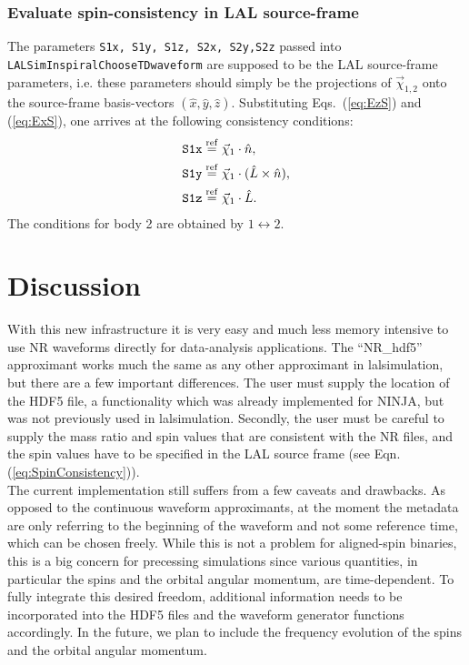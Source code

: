 \documentclass[aps,prd,amssymb,amsmath,amsfonts,superscriptaddress,
floatfix ,preprintnumbers,altaffilletter]{revtex4}
\newcommand{\nNR}{\hat{n}}
\newcommand{\lNR}{\hat L}
\newcommand{\ExS}{{{\hat x}}}
\newcommand{\EyS}{{{\hat y}}}
\newcommand{\EzS}{{{\hat z}}}
\newcommand{\equalref}{\overset{\rm ref}{=}}
\begin{document}
\subsubsection{Evaluate spin-consistency in LAL source-frame}

The parameters {\tt S1x, S1y, S1z, S2x, S2y,S2z} passed into {\tt
  LALSimInspiralChooseTDwaveform} are supposed to be the LAL
source-frame parameters, i.e. these parameters should simply be the
projections of $\vec\chi_{1,2}$ onto the source-frame basis-vectors
$(\ExS,\EyS,\EzS)$.  Substituting Eqs.~(\ref{eq:EzS}) and (\ref{eq:ExS}),
one arrives at the following consistency conditions:
\begin{subequations}
\label{eq:SpinConsistency}
  \begin{align}
    \mbox{\tt S1x} &  \equalref \vec\chi_1 \cdot \nNR,\\
    \mbox{\tt S1y} &  \equalref \vec\chi_1\cdot (\lNR\times\nNR),\\
    \mbox{\tt S1z} &  \equalref \vec\chi_1 \cdot \lNR.
  \end{align}
\end{subequations}
The conditions for body 2 are obtained by $1\leftrightarrow 2$.\\


\section{Discussion}
\label{sec:discussion}

With this new infrastructure it is very easy and much less memory intensive to use NR waveforms
directly for data-analysis applications. The ``NR\_hdf5'' approximant works much the same as any other approximant
in lalsimulation, but there are a few important differences.
The user must supply the location of the HDF5 file, a functionality which was already implemented for NINJA, but was not
previously used in lalsimulation. Secondly, the user must be careful to supply the mass ratio and spin values that
are consistent with the NR files, and the spin values have to be specified in the LAL source frame (see Eqn. (\ref{eq:SpinConsistency})). \\

The current implementation still suffers from a few caveats and drawbacks. As opposed to the continuous waveform approximants, at the moment the metadata are only referring to the beginning of the waveform and not some reference time, which can be chosen freely. While this is not a problem for aligned-spin binaries, this is a big concern for precessing simulations since various quantities, in particular the spins and the orbital angular momentum, are time-dependent. To fully integrate this desired freedom, additional information needs to be incorporated into the HDF5 files and the waveform generator functions accordingly. In the future, we plan to include the frequency evolution of the spins and the orbital angular momentum.
\end{document}
